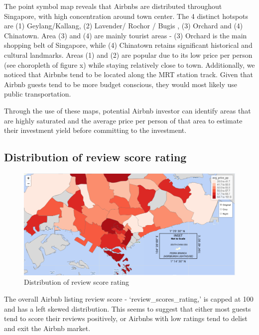 \documentclass{acm_proc_article-sp}
\begin{document}
The point symbol map reveals that Airbnbs are distributed throughout
Singapore, with high concentration around town center. The 4 distinct
hotspots are (1) Geylang/Kallang, (2) Lavender/ Rochor / Bugis , (3)
Orchard and (4) Chinatown. Area (3) and (4) are mainly tourist areas -
(3) Orchard is the main shopping belt of Singapore, while (4) Chinatown
retains significant historical and cultural landmarks. Areas (1) and (2)
are popular due to its low price per person (see choropleth of figure x)
while staying relatively close to town. Additionally, we noticed that
Airbnbs tend to be located along the MRT station track. Given that
Airbnb guests tend to be more budget conscious, they would most likely
use public transportation.

Through the use of these maps, potential Airbnb investor can identify
areas that are highly saturated and the average price per person of that
area to estimate their investment yield before committing to the
investment.

\hypertarget{distribution-of-review-score-rating}{%
\subsection{Distribution of review score
rating}\label{distribution-of-review-score-rating}}

\begin{figure}[H]

{\centering \includegraphics[width=1\linewidth]{images/usecase_explore2} 

}

\caption{Distribution of review score rating}\label{fig:unnamed-chunk-18}
\end{figure}

The overall Airbnb listing review score - `review\_scores\_rating,' is
capped at 100 and has a left skewed distribution. This seems to suggest
that either most guests tend to score their reviews positively, or
Airbnbs with low ratings tend to delist and exit the Airbnb market.
\end{document}
